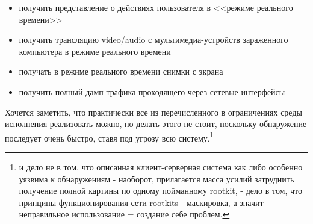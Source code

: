 \begin{itemize}
\item{получить представление о действиях пользователя в <<режиме реального времени>>}
\item{получить трансляцию video/audio с мультимедиа-устройств зараженного компьютера в
режиме реального времени}
\item{получать в режиме реального времени снимки с экрана}
\item{получить полный дамп трафика проходящего через сетевые интерфейсы }
\end{itemize}

Хочется заметить, что практически все из перечисленного в ограничениях среды исполнения реализовать
можно, но делать этого не стоит, поскольку обнаружение последует очень быстро, ставя под угрозу всю
систему.\footnote{и дело не в том, что описанная клиент-серверная система как либо особенно уязвима
к обнаружениям - наоборот, прилагается масса усилий затруднить получение полной картины по одному пойманному rootkit, - дело в том, что принципы функционирования сети rootkits - маскировка, а значит 
неправильное использование = создание себе проблем.}





